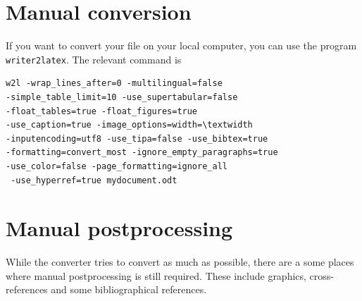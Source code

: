 \section{Manual conversion}
If you want to convert your file on your local computer, you can use the program \verb+writer2latex+. The relevant command is 
\begin{verbatim}
w2l -wrap_lines_after=0 -multilingual=false 
-simple_table_limit=10 -use_supertabular=false 
-float_tables=true -float_figures=true 
-use_caption=true -image_options=width=\textwidth 
-inputencoding=utf8 -use_tipa=false -use_bibtex=true  
-formatting=convert_most -ignore_empty_paragraphs=true 
-use_color=false -page_formatting=ignore_all
 -use_hyperref=true mydocument.odt
\end{verbatim}

\section{Manual postprocessing}
While the converter tries to convert as much as possible, there are a some places where manual postprocessing is still required.
These include graphics, cross-references and some bibliographical references.

% 
% 
% 
% 
% 
% 

